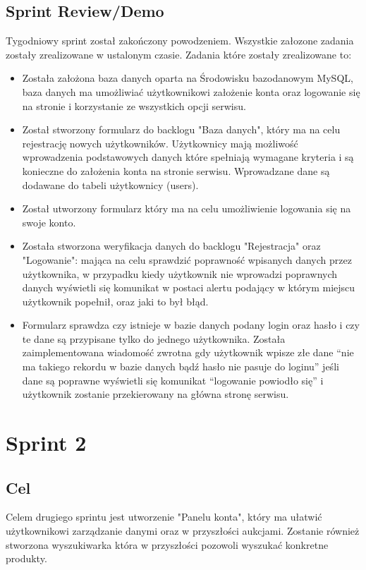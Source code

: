 \documentclass[a4paper]{article}
\begin{document}
	\subsection{Sprint Review/Demo}
	Tygodniowy sprint został zakończony powodzeniem. Wszystkie załozone zadania zostały zrealizowane w ustalonym czasie. Zadania które zostały zrealizowane to:
\begin{itemize}
\item Została założona baza danych oparta na Środowisku bazodanowym MySQL, baza danych ma umożliwiać użytkownikowi założenie konta oraz logowanie się na stronie i korzystanie ze wszystkich opcji serwisu.
\item Został stworzony formularz do backlogu "Baza danych", który ma na celu rejestrację nowych użytkowników. Użytkownicy mają możliwość wprowadzenia podstawowych danych które spełniają wymagane kryteria i są konieczne do założenia konta na stronie serwisu. Wprowadzane dane są dodawane do tabeli użytkownicy (users).
\item Został utworzony formularz który ma na celu umożliwienie logowania się na swoje konto. 
\item Została stworzona weryfikacja danych do backlogu "Rejestracja" oraz "Logowanie": mająca na celu sprawdzić poprawność wpisanych danych przez użytkownika, w przypadku kiedy użytkownik nie wprowadzi poprawnych danych wyświetli się komunikat w postaci alertu podający w którym miejscu użytkownik popełnił, oraz jaki to był błąd.
\item Formularz sprawdza czy istnieje w bazie danych podany login oraz hasło i czy te dane są przypisane tylko do jednego użytkownika. Została zaimplementowana wiadomość zwrotna gdy użytkownik wpisze złe dane “nie ma takiego rekordu w bazie danych bądź hasło nie pasuje do loginu” jeśli dane są poprawne wyświetli się komunikat “logowanie powiodło się” i użytkownik zostanie przekierowany na główna stronę serwisu.

\end{itemize}

	\section{Sprint 2}
	
	\subsection{Cel} Celem drugiego sprintu jest utworzenie "Panelu konta", który ma ułatwić użytkownikowi zarządzanie danymi oraz w przyszłości aukcjami. Zostanie również stworzona wyszukiwarka która w przyszłości pozowoli wyszukać konkretne produkty.
	
\end{document}

